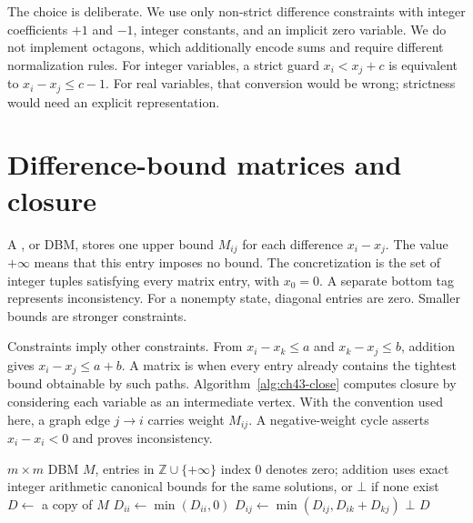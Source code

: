 The choice is deliberate.
We use only non-strict difference constraints with integer coefficients $+1$ and $-1$, integer constants, and an implicit zero variable.
We do not implement octagons, which additionally encode sums and require different normalization rules.
For integer variables, a strict guard $x_i<x_j+c$ is equivalent to $x_i-x_j\leq c-1$.
For real variables, that conversion would be wrong; strictness would need an explicit representation.

\section{Difference-bound matrices and closure}
\label{sec:ch43-dbm}

A , or DBM, stores one upper bound $M_{ij}$ for each difference $x_i-x_j$.
The value $+\infty$ means that this entry imposes no bound.
The concretization is the set of integer tuples satisfying every matrix entry, with $x_0=0$.
A separate bottom tag represents inconsistency.
For a nonempty state, diagonal entries are zero.
Smaller bounds are stronger constraints.

Constraints imply other constraints.
From $x_i-x_k\leq a$ and $x_k-x_j\leq b$, addition gives $x_i-x_j\leq a+b$.
A matrix is  when every entry already contains the tightest bound obtainable by such paths.
Algorithm~\ref{alg:ch43-close} computes closure by considering each variable as an intermediate vertex.
With the convention used here, a graph edge $j\to i$ carries weight $M_{ij}$.
A negative-weight cycle asserts $x_i-x_i<0$ and proves inconsistency.

\begin{algorithm}
\caption{Close an integer DBM and detect inconsistency.}
\label{alg:ch43-close}
\begin{pseudocode}
\Require $m\times m$ DBM $M$, entries in $\mathbb{Z}\cup\{+\infty\}$
\Require index $0$ denotes zero; addition uses exact integer arithmetic
\Ensure canonical bounds for the same solutions, or $\bot$ if none exist
\State $D\gets$ a copy of $M$
  \State $D_{ii}\gets\min(D_{ii},0)$
\EndFor
{}
        \State $D_{ij}\gets\min(D_{ij},D_{ik}+D_{kj})$
      \EndIf
    \EndFor
  \EndFor
    \State \Return $\bot$
  \EndIf
\EndFor
\State \Return $D$
\end{pseudocode}
\end{algorithm}

